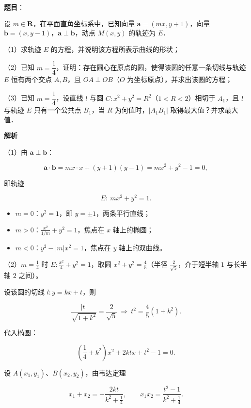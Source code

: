 \begin{answer}

\textbf{题目}：

设 $m\in\mathbf R$，在平面直角坐标系中，已知向量 $\boldsymbol a=(mx,y+1)$，向量 $\boldsymbol b=(x,y-1)$，$\boldsymbol a\perp\boldsymbol b$，动点 $M(x,y)$ 的轨迹为 $E$．

（1）求轨迹 $E$ 的方程，并说明该方程所表示曲线的形状；

（2）已知 $m=\dfrac14$，证明：存在圆心在原点的圆，使得该圆的任意一条切线与轨迹 $E$ 恒有两个交点 $A,B$，且 $OA\perp OB$（$O$ 为坐标原点），并求出该圆的方程；

（3）已知 $m=\dfrac14$，设直线 $l$ 与圆 $C:x^2+y^2=R^2$（$1<R<2$）相切于 $A_1$，且 $l$ 与轨迹 $E$ 只有一个公共点 $B_1$，当 $R$ 为何值时，$|A_1B_1|$ 取得最大值？并求最大值．

\textbf{解析}

（1）由 $\boldsymbol a\perp\boldsymbol b$：

\nopagebreak[4]
\[\boldsymbol a\cdot\boldsymbol b=mx\cdot x+(y+1)(y-1)=mx^2+y^2-1=0,\]

即轨迹

\nopagebreak[4]
\[E:\ mx^2+y^2=1 .\]

\begin{itemize}
\item $m=0$：$y^2=1$，即 $y=\pm1$，两条平行直线；
\item $m>0$：$\frac{x^2}{1/m}+y^2=1$，焦点在 $x$ 轴上的椭圆；
\item $m<0$：$y^2-|m|x^2=1$，焦点在 $y$ 轴上的双曲线。
\end{itemize}

（2）$m=\frac14$ 时 $E:\frac{x^2}{4}+y^2=1$，取圆 $x^2+y^2=\frac45$（半径 $\frac2{\sqrt5}$，介于短半轴 $1$ 与长半轴 $2$ 之间）。

设该圆的切线 $l:y=kx+t$，则

\nopagebreak[4]
\[\frac{|t|}{\sqrt{1+k^2}}=\frac2{\sqrt5}\ \Longrightarrow\ t^2=\frac45(1+k^2).\]

代入椭圆：

\nopagebreak[4]
\[\left(\frac14+k^2\right)x^2+2ktx+t^2-1=0 .\]

设 $A(x_1,y_1)$、$B(x_2,y_2)$，由韦达定理

\nopagebreak[4]
\[x_1+x_2=-\frac{2kt}{k^2+\frac14},\qquad x_1x_2=\frac{t^2-1}{k^2+\frac14}.\]


\end{answer}
